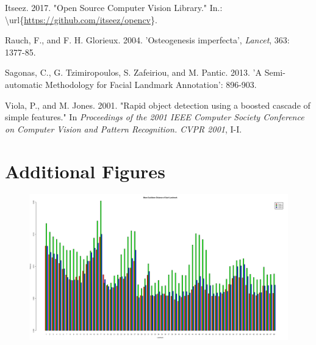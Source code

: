 \documentclass{article}
\begin{document}
\begin{multicols}{2}
Itseez. 2017. "Open Source Computer Vision Library." In.:
\textbackslash{}url\{\url{https://github.com/itseez/opencv}\}.

Rauch, F., and F. H. Glorieux. 2004. 'Osteogenesis imperfecta',
\emph{Lancet}, 363: 1377-85.

Sagonas, C., G. Tzimiropoulos, S. Zafeiriou, and M. Pantic. 2013. 'A
Semi-automatic Methodology for Facial Landmark Annotation': 896-903.

Viola, P., and M. Jones. 2001. "Rapid object detection using a boosted
cascade of simple features." In \emph{Proceedings of the 2001 IEEE
Computer Society Conference on Computer Vision and Pattern Recognition.
CVPR 2001}, I-I.

\printbibliography

\end{multicols}

\appendix

\section{Additional Figures}

\begin{figure}
\centering
\includegraphics[width=\linewidth]{figures/histo.png}

\end{figure}
\end{document}
